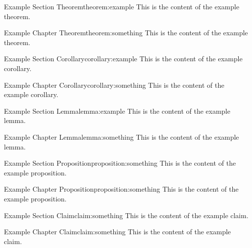 \documentclass[11pt]{report}
\begin{document}

\begin{section_theorem}{Example Section Theorem}{theorem:example}
    This is the content of the example theorem.
\end{section_theorem}

\begin{chapter_theorem}{Example Chapter Theorem}{theorem:something}
    This is the content of the example theorem.
\end{chapter_theorem}

\begin{section_corollary}{Example Section Corollary}{corollary:example}
    This is the content of the example corollary.
\end{section_corollary}

\begin{chapter_corollary}{Example Chapter Corollary}{corollary:something}
    This is the content of the example corollary.
\end{chapter_corollary}

\begin{section_lemma}{Example Section Lemma}{lemma:example}
    This is the content of the example lemma.
\end{section_lemma}

\begin{chapter_lemma}{Example Chapter Lemma}{lemma:something}
    This is the content of the example lemma.
\end{chapter_lemma}

\begin{section_proposition}{Example Section Proposition}{proposition:something}
    This is the content of the example proposition.
\end{section_proposition}

\begin{chapter_proposition}{Example Chapter Proposition}{proposition:something}
    This is the content of the example proposition.
\end{chapter_proposition}

\begin{section_claim}{Example Section Claim}{claim:something}
    This is the content of the example claim.
\end{section_claim}

\begin{chapter_claim}{Example Chapter Claim}{claim:something}
    This is the content of the example claim.
\end{chapter_claim}
\end{document}
